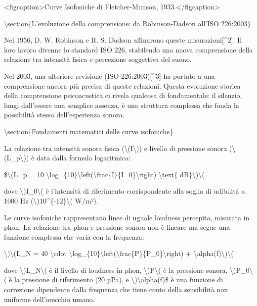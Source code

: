 \documentclass[a4paper,11pt]{article}
\begin{document}
<figcaption>Curve Isofoniche di Fletcher-Munson, 1933.</figcaption>

\textbackslash{}section\{L'evoluzione della comprensione: da Robinson-Dadson all'ISO 226:2003\}

Nel 1956, D. W. Robinson e R. S. Dadson affinarono queste
misurazioni[\textasciicircum{}2]. Il loro lavoro divenne lo standard ISO 226, stabilendo
una nuova comprensione della relazione tra intensit\`a fisica e percezione
soggettiva del suono.

Nel 2003, una ulteriore revisione (ISO 226:2003)[\textasciicircum{}3] ha portato a una
comprensione ancora pi\`u precisa di queste relazioni. Questa evoluzione
storica della comprensione psicoacustica ci rivela qualcosa di
fondamentale: il silenzio, lungi dall'essere una semplice assenza, \`e una
struttura complessa che fonda la possibilit\`a stessa dell'esperienza
sonora.

\textbackslash{}section\{Fondamenti matematici delle curve isofoniche\}

La relazione tra intensit\`a sonora fisica (\textbackslash{}(I\textbackslash{})) e livello di pressione
sonora (\textbackslash{}(L\_p\textbackslash{})) \`e data dalla formula logaritmica:

\$\textbackslash{}(L\_p = 10 \textbackslash{}log\_\{10\}\textbackslash{}left(\textbackslash{}frac\{I\}\{I\_0\}\textbackslash{}right) \textbackslash{}text\{ dB\}\textbackslash{})\textbackslash{}(

dove \textbackslash{})I\_0\textbackslash{}( \`e l'intensit\`a di riferimento corrispondente alla soglia di
udibilit\`a a 1000 Hz (\textbackslash{})10\textasciicircum{}\{-12\}\textbackslash{}( W/m²).

Le curve isofoniche rappresentano linee di uguale loudness percepita,
misurata in phon. La relazione tra phon e pressione sonora non \`e lineare
ma segue una funzione complessa che varia con la frequenza:

\textbackslash{})\textbackslash{}(L\_N = 40 \textbackslash{}cdot \textbackslash{}log\_\{10\}\textbackslash{}left(\textbackslash{}frac\{P\}\{P\_0\}\textbackslash{}right) + \textbackslash{}alpha(f)\textbackslash{})\textbackslash{}(

dove \textbackslash{})L\_N\textbackslash{}( \`e il livello di loudness in phon, \textbackslash{})P\textbackslash{}( \`e la pressione sonora,
\textbackslash{})P\_0\textbackslash{}( \`e la pressione di riferimento (20 µPa), e \textbackslash{})\textbackslash{}alpha(f)\$ \`e una
funzione di correzione dipendente dalla frequenza che tiene conto della
sensibilit\`a non uniforme dell'orecchio umano.
\end{document}

